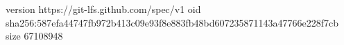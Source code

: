 version https://git-lfs.github.com/spec/v1
oid sha256:587efa44747fb972b413c09e93f8e883fb48bd607235871143a47766e228f7cb
size 67108948
